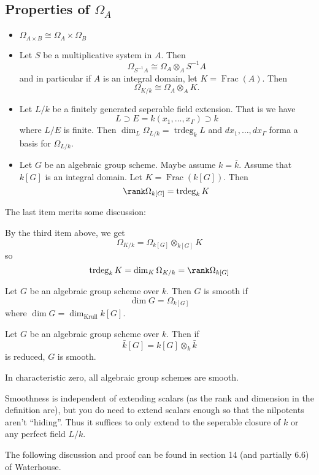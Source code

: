 \documentclass[12pt]{article}
\begin{document}
\subsection{Properties of \texorpdfstring{$\Omega_A$}{Omega A}}
\begin{itemize}
	\item $\Omega_{A\times B}\cong\Omega_A\times\Omega_B$
	\item Let $S$ be a multiplicative system in $A$. Then  
	\[\Omega_{S^{-1}A}\cong \Omega_A\otimes_A S^{-1}A\]
	and in particular if $A$ is an integral domain, let $K=\operatorname{Frac}(A).$ Then 
	\[\Omega_{K/k}\cong \Omega_A\otimes_A K.\]
	\item Let $L/k$ be a finitely generated seperable field extension. That is we have 
	\[L\supset E=k(x_1,\dots,x_\Gamma)\supset k\]
	where $L/E$ is finite. Then $\dim_L\Omega_{L/k}=\operatorname{trdeg}_k L$ and $dx_1,\dots,dx_\Gamma$ forma a basis for $\Omega_{L/k}$.
	\item Let $G$ be an algebraic group scheme. Maybe assume $k=\bar k$. Assume that $k[G]$ is an integral domain. Let $K=\operatorname{Frac}(k[G])$. Then 
	\[\rank\Omega_{k[G]}=\operatorname{trdeg}_k K\]
\end{itemize}
The last item merits some discussion:
\begin{prf}
	By the third item above, we get 
	\[\Omega_{K/k}=\Omega_{k[G]}\otimes_{k[G]}K\]
	so 
	\[\operatorname{trdeg}_k K=\dim_K\Omega_{K/k}=\rank \Omega_{k[G]}\]
\end{prf}
\begin{defn}
	Let $G$ be an algebraic group scheme over $k$. Then $G$ is smooth if 
	\[\dim G=\Omega_{k[G]}\]
	where $\dim G=\dim_{\text{Krull}} k[G]$.
\end{defn}
\begin{thm}\label{thm:smoothgrps}
	Let $G$ be an algebraic group scheme over $k$. Then if
	\[\bar k[G]=k[G]\otimes_k \bar k\]
	is reduced, $G$ is smooth.
\end{thm}
\begin{cor}
	In characteristic zero, all algebraic group schemes are smooth.
\end{cor}
\begin{rmk}
	Smoothness is independent of extending scalars (as the rank and dimension in the definition are), but 
	you do need to extend scalars enough so that the nilpotents aren't ``hiding''. Thus it suffices to only extend to 
	the seperable closure of $k$ or any perfect field $L/k$.
\end{rmk}
The following discussion and proof can be found in section 14 (and partially 6.6) of Waterhouse.
\end{document}
